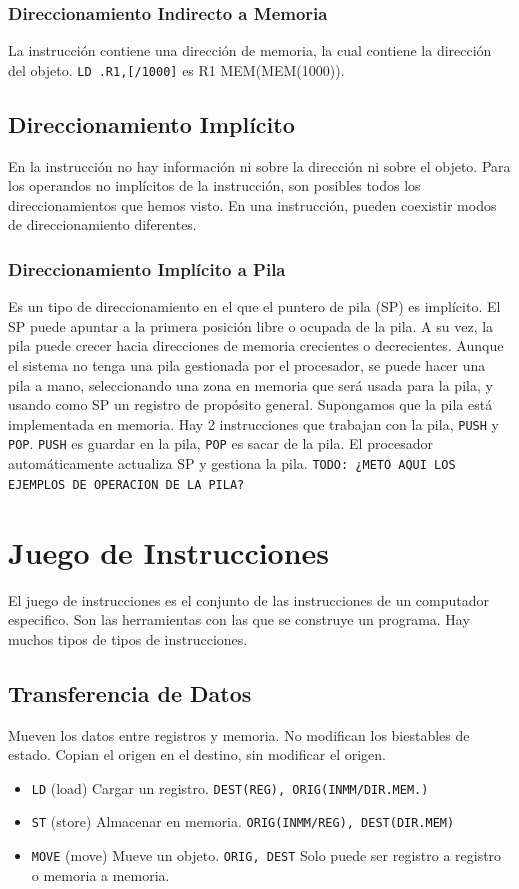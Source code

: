 \documentclass[a4paper,11pt,spanish]{report}
\begin{document}
\subsubsection{Direccionamiento Indirecto a Memoria}
La instrucción contiene una dirección de memoria, la cual contiene la dirección del objeto. \verb|LD .R1,[/1000]| es R1 \textleftarrow MEM(MEM(1000)).
\subsection{Direccionamiento Implícito}
En la instrucción no hay información ni sobre la dirección ni sobre el objeto. Para los operandos no implícitos de la instrucción, son posibles todos los direccionamientos que hemos visto. En una instrucción, pueden coexistir modos de direccionamiento diferentes.
\subsubsection{Direccionamiento Implícito a Pila}
Es un tipo de direccionamiento en el que el puntero de pila (SP) es implícito. El SP puede apuntar a la primera posición libre o ocupada de la pila. A su vez, la pila puede crecer hacia direcciones de memoria crecientes o decrecientes.
Aunque el sistema no tenga una pila gestionada por el procesador, se puede hacer una pila a mano, seleccionando una zona en memoria que será usada para la pila, y usando como SP un registro de propósito general.
Supongamos que la pila está implementada en memoria. Hay 2 instrucciones que trabajan con la pila, \verb|PUSH| y \verb|POP|. \verb|PUSH| es guardar en la pila, \verb|POP| es sacar de la pila. El procesador automáticamente actualiza SP y gestiona la pila.
\verb|TODO: ¿METO AQUI LOS EJEMPLOS DE OPERACION DE LA PILA?|
\section{Juego de Instrucciones}
El juego de instrucciones es el conjunto de las instrucciones de un computador especifico. Son las herramientas con las que se construye un programa. Hay muchos tipos de tipos de instrucciones.
\subsection{Transferencia de Datos}
Mueven los datos entre registros y memoria. No modifican los biestables de estado. Copian el origen en el destino, sin modificar el origen.
\begin{itemize}
\item \verb|LD| (load) Cargar un registro. \verb|DEST(REG), ORIG(INMM/DIR.MEM.)|
\item \verb|ST| (store) Almacenar en memoria. \verb|ORIG(INMM/REG), DEST(DIR.MEM)|
\item \verb|MOVE| (move) Mueve un objeto. \verb|ORIG, DEST| Solo puede ser registro a registro o memoria a memoria.
\end{itemize}
\end{document}
